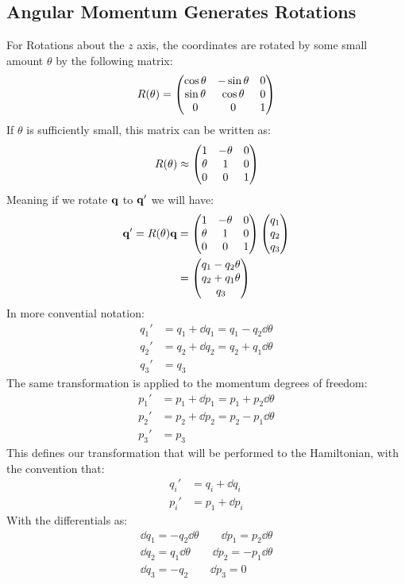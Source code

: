 \documentclass[12pt]{article}
\theoremstyle{plain}
\theoremstyle{definition}
\begin{document}
\subsection{Angular Momentum Generates Rotations}
For Rotations about the $z$ axis, the coordinates are rotated by some small amount $\theta$ by the following matrix:
\begin{align*}
  R(\theta)=\pmqty{\cos\theta&-\sin\theta&0\\\sin\theta&\cos\theta&0\\0&0&1}
\end{align*}
If $\theta$ is sufficiently small, this matrix can be written as:
\begin{align*}
  R(\theta)\approx\pmqty{1&-\theta&0\\\theta&1&0\\0&0&1}
\end{align*}
Meaning if we rotate $\vb{q}$ to $\vb{q}'$ we will have:
\begin{align*}
  \vb{q}'=R(\theta)\vb{q}&=\pmqty{1&-\theta&0\\\theta&1&0\\0&0&1}
  \pmqty{q_1\\q_2\\q_3}\\
  &=\pmqty{q_1-q_2\theta\\q_2+q_1\theta\\q_3}
\end{align*}
In more convential notation:
\begin{align*}
  q_1'&=q_1+\dd{q_1}=q_1-q_2\dd{\theta}\\
  q_2'&=q_2+\dd{q_2}=q_2+q_1\dd{\theta}\\
  q_3'&=q_3
\end{align*}
The same transformation is applied to the momentum degrees of freedom:
\begin{align*}
  p_1'&=p_1+\dd{p_1}=p_1+p_2\dd{\theta}\\
  p_2'&=p_2+\dd{p_2}=p_2-p_1\dd{\theta}\\
  p_3'&=p_3
\end{align*}
This defines our transformation that will be performed to the Hamiltonian, with the convention that:
\begin{align*}
  q_i'&=q_i+\dd{q_i}\\
  p_i'&=p_1+\dd{p_i}
\end{align*}
With the differentials as:
\begin{gather*}
  \dd{q_1}=-q_2\dd{\theta}\qquad\dd{p_1}= p_2\dd{\theta}\\
  \dd{q_2}= q_1\dd{\theta}\qquad\dd{p_2}=-p_1\dd{\theta}\\
  \dd{q_3}=-q_2\qquad\dd{p_3}=0
\end{gather*}
\end{document}
